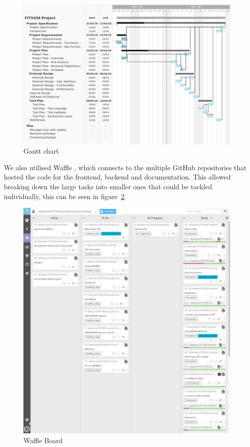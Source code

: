 \documentclass[a4paper,11pt]{article}
\begin{document}
\begin{figure}[H]
  \includegraphics[width=\textwidth]{gantt-chart}
  \caption{Gantt chart}\label{fig:gantt}
\end{figure}

We also utilised Waffle \autocite{waf:20}, which connects to the multiple GitHub
repositories that hosted the code for the frontend, backend and documentation.
This allowed breaking down the large tasks into smaller ones that could be
tackled individually, this can be seen in figure~\ref{fig:waffle}.

\begin{figure}[H]
  \includegraphics[width=\textwidth]{waffle-io}
  \caption{Waffle Board}\label{fig:waffle}
\end{figure}
\end{document}
